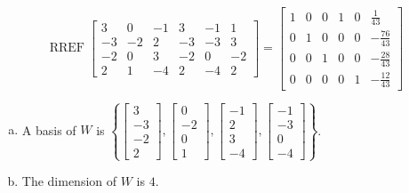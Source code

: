 \begin{exerciseAnswer} 


\[\operatorname{RREF} \left[\begin{array}{cccccc}
3 & 0 & -1 & 3 & -1 & 1 \\
-3 & -2 & 2 & -3 & -3 & 3 \\
-2 & 0 & 3 & -2 & 0 & -2 \\
2 & 1 & -4 & 2 & -4 & 2
\end{array}\right] = \left[\begin{array}{cccccc}
1 & 0 & 0 & 1 & 0 & \frac{1}{43} \\
0 & 1 & 0 & 0 & 0 & -\frac{76}{43} \\
0 & 0 & 1 & 0 & 0 & -\frac{28}{43} \\
0 & 0 & 0 & 0 & 1 & -\frac{12}{43}
\end{array}\right] \]


\begin{enumerate}[(a)]
\item A basis of \(W\) is \( \left\{ \left[\begin{array}{c}
3 \\
-3 \\
-2 \\
2
\end{array}\right] , \left[\begin{array}{c}
0 \\
-2 \\
0 \\
1
\end{array}\right] , \left[\begin{array}{c}
-1 \\
2 \\
3 \\
-4
\end{array}\right] , \left[\begin{array}{c}
-1 \\
-3 \\
0 \\
-4
\end{array}\right] \right\} \).
\item The dimension of \(W\) is \( 4 \).
\end{enumerate}
    
\end{exerciseAnswer}
    
